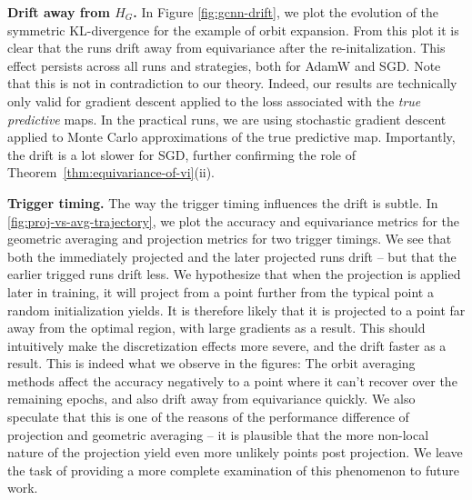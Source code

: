 \documentclass{article}
\begin{document}
\textbf{Drift away from $H_G$.}  In Figure \ref{fig:gcnn-drift}, we plot the evolution of the symmetric KL-divergence for the example of orbit expansion. From this plot it is clear that the runs drift away from equivariance after the re-initalization. This effect persists across all runs and strategies, both for AdamW and SGD. Note that this is not in contradiction to our theory. Indeed, our results are technically only valid for gradient descent applied to the loss associated with the \emph{true predictive} maps. In the practical runs, we are using stochastic gradient descent applied to Monte Carlo approximations of the true predictive map. Importantly, the drift is a lot slower for SGD, further confirming the role of Theorem~\ref{thm:equivariance-of-vi}(ii). 

\textbf{Trigger timing.} The way the trigger timing influences the drift is subtle. In \cref{fig:proj-vs-avg-trajectory}, we plot the accuracy and equivariance metrics for the geometric averaging and projection metrics for two trigger timings. We see that both the immediately projected and the later projected runs drift -- but that the earlier trigged runs drift less. We hypothesize that when the projection is applied later in training, it will project from a point further from the typical point a random initialization yields. It is therefore likely that it is projected to a point far away from the optimal region, with large gradients as a result. This should intuitively make the discretization effects more severe, and the drift faster as a result. This is indeed what we observe in the figures: The orbit averaging methods affect the accuracy negatively to a point where it can't recover over the remaining epochs, and also drift away from equivariance quickly. We also speculate that this is one of the reasons of the performance difference of projection and geometric averaging --  it is plausible that the more non-local nature of the projection yield even more unlikely points post projection. We leave the task of providing a more complete examination of this phenomenon to future work.
\end{document}
